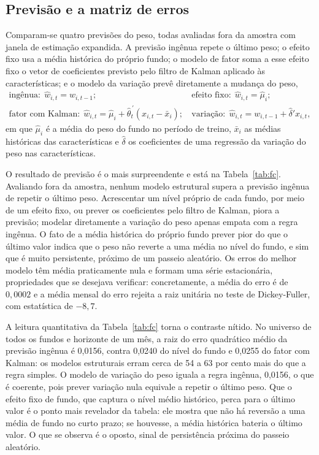 \documentclass[12pt,a4paper]{article}
\begin{document}
\subsection{Previsão e a matriz de erros}

Comparam-se quatro previsões do peso, todas avaliadas fora da amostra com janela de estimação
expandida. A previsão ingênua repete o último peso; o efeito fixo usa a média histórica do próprio
fundo; o modelo de fator soma a esse efeito fixo o vetor de coeficientes previsto pelo filtro de
Kalman aplicado às características; e o modelo da variação prevê diretamente a mudança do peso,
\begin{align*}
\text{ingênua:}\ \ \widehat{w}_{i,t}=w_{i,t-1};
&\qquad
\text{efeito fixo:}\ \ \widehat{w}_{i,t}=\widehat{\mu}_i;\\
\text{fator com Kalman:}\ \ \widehat{w}_{i,t}=\widehat{\mu}_i+\widehat{\theta}_t^{\,\prime}(x_{i,t}-\bar{x}_i);
&\qquad
\text{variação:}\ \ \widehat{w}_{i,t}=w_{i,t-1}+\widehat{\delta}'x_{i,t},
\end{align*}
em que $\widehat{\mu}_i$ é a média do peso do fundo no período de treino, $\bar{x}_i$ as médias
históricas das características e $\widehat{\delta}$ os coeficientes de uma regressão da variação do
peso nas características.

O resultado de previsão é o mais surpreendente e está na Tabela~\ref{tab:fc}. Avaliando fora da
amostra, nenhum modelo estrutural supera a previsão ingênua de repetir o último peso. Acrescentar
um nível próprio de cada fundo, por meio de um efeito fixo, ou prever os coeficientes pelo filtro
de Kalman, piora a previsão; modelar diretamente a variação do peso apenas empata com a regra
ingênua. O fato de a média histórica do próprio fundo prever pior do que o último valor indica que
o peso não reverte a uma média no nível do fundo, e sim que é muito persistente, próximo de um
passeio aleatório. Os erros do melhor modelo têm média praticamente nula e formam uma série
estacionária, propriedades que se desejava verificar: concretamente, a média do erro é de $0{,}0002$
e a média mensal do erro rejeita a raiz unitária no teste de Dickey-Fuller, com estatística de
$-8{,}7$.

A leitura quantitativa da Tabela~\ref{tab:fc} torna o contraste nítido. No universo de todos os
fundos e horizonte de um mês, a raiz do erro quadrático médio da previsão ingênua é 0,0156, contra
0,0240 do nível do fundo e 0,0255 do fator com Kalman: os modelos estruturais erram cerca de 54 a
63 por cento mais do que a regra simples. O modelo de variação do peso iguala a regra ingênua,
0,0156, o que é coerente, pois prever variação nula equivale a repetir o último peso. Que o efeito
fixo de fundo, que captura o nível médio histórico, perca para o último valor é o ponto mais
revelador da tabela: ele mostra que não há reversão a uma média de fundo no curto prazo; se
houvesse, a média histórica bateria o último valor. O que se observa é o oposto, sinal de
persistência próxima do passeio aleatório.
\end{document}
